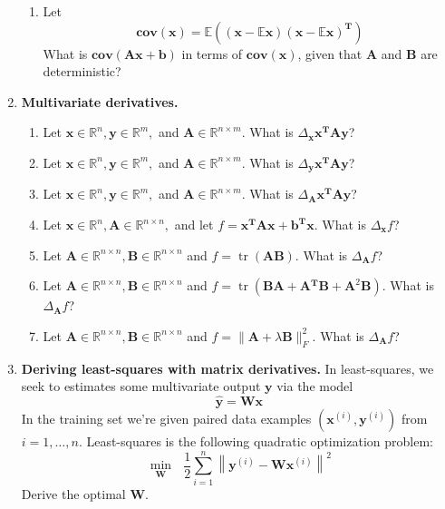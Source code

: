 \documentclass [11pt] {article}
\newcommand{\R}{\mathbb{R}}
\newcommand{\T}{\bf{T}}
\newcommand{\x}{\bf{x}}
\newcommand{\y}{\bf{y}}
\newcommand{\A}{\bf{A}}
\newcommand{\B}{\bf{B}}
\newcommand{\W}{\bf{W}}
\newcommand{\AT}{\bf{A$^{\T}$}}
\DeclareMathOperator{\tr}{tr}
\renewcommand{\bf}[1]{\textbf{{#1}}}
\begin{document}
\begin{enumerate}
\begin{enumerate}
            \item Let
                \[\bf{cov}(\x) = \mathbb{E}\left( \left( \x - \mathbb{E} \x \right) \left( \x - \mathbb{E} \x \right)^\T \right)\]
                What is $\bf{cov}(\A \x + \bf{b})$ in terms of $\bf{cov}(\x)$, given that $\A$ and 
                $\bf{B}$ are deterministic?
        \end{enumerate}

    \item \bf{Multivariate derivatives.}
        \begin{enumerate}[itemsep=10pt]
            \item Let $\x \in \R^n, \y \in \R^m,$ and $\A \in \R^{n \times m}$. 
                What is $\Delta_{\x} \x^{\T} \A \y$?
            \item Let $\x \in \R^n, \y \in \R^m,$ and $\A \in \R^{n \times m}$. 
                What is $\Delta_{\y} \x^{\T} \A \y$?
            \item Let $\x \in \R^n, \y \in \R^m,$ and $\A \in \R^{n \times m}$. 
                What is $\Delta_{\A} \x^{\T} \A \y$?
            \item Let $\x \in \R^n, \A \in \R^{n \times n},$ and let 
                $f = \x^{\T} \A \x + \bf{b}^{\T} \x$. What is $\Delta_{\x} f$?
            \item Let $\A \in \R^{n \times n}, \B \in \R^{n \times n}$ and 
                $f = \tr\left( \A \B \right)$. What is $\Delta_{\A} f$?
            \item Let $\A \in \R^{n \times n}, \B \in \R^{n \times n}$ and 
                $f = \tr\left( \B \A + \AT \B + \A^2 \B \right)$. What is $\Delta_{\A} f$?
            \item Let $\A \in \R^{n \times n}, \B \in \R^{n \times n}$ and 
                $f = \| \A + \lambda \B \|^{2}_{F}$. What is $\Delta_{\A} f$?
        \end{enumerate}

    \item \bf{Deriving least-squares with matrix derivatives.} 
        \newline
        In least-squares, we seek to estimates some multivariate output $\y$ via the model
        \[\hat{\bf{y}} = \W \x\]
        In the training set we're given paired data examples $\left( \x^{(i)}, \y^{(i)} \right)$
        from $i = 1, \ldots, n$. Least-squares is the following quadratic optimization problem:
        \[\underset{\W}{\min} \text{ } \frac{1}{2} \sum^{n}_{i = 1} \left\| \y^{(i)} - \W \x^{(i)} \right\|^2\]
        Derive the optimal $\W$. \vspace{10pt}


\end{enumerate}
\end{document}
